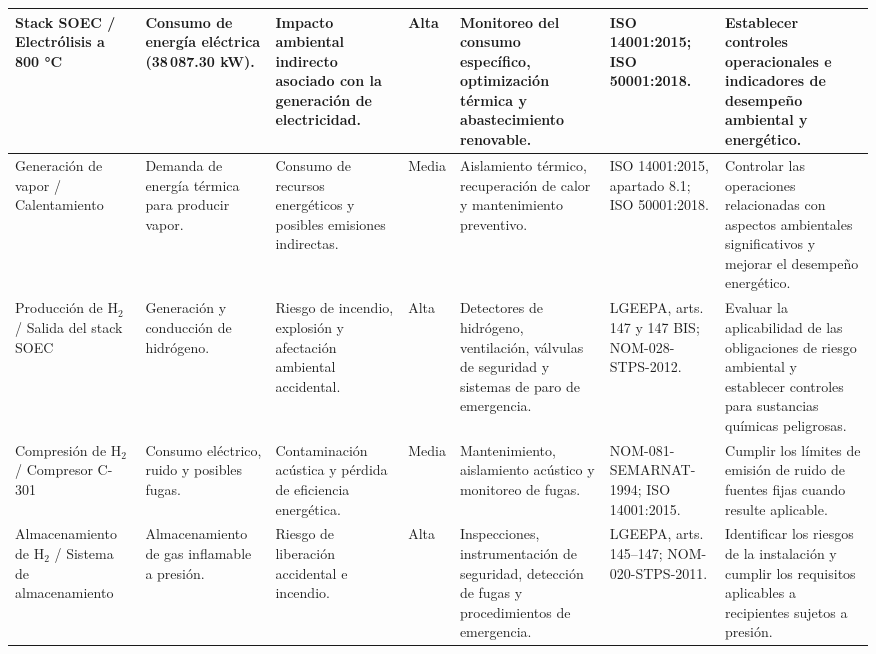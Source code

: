 \documentclass[11pt,letterpaper]{article}
\begin{document}
\begin{landscape}
\begin{center}
\begin{longtable}{
|p{2.7cm}
|p{2.7cm}
|p{3.0cm}
|p{1.5cm}
|p{3.8cm}
|p{3.1cm}
|p{4.2cm}|}

Stack SOEC /
Electrólisis a 800 °C
&
Consumo de energía eléctrica
(38\,087.30 kW).
&
Impacto ambiental indirecto
asociado con la generación
de electricidad.
&
\cellcolor{rojoclaro}Alta
&
Monitoreo del consumo específico,
optimización térmica y
abastecimiento renovable.
&
ISO 14001:2015;
ISO 50001:2018.
&
Establecer controles operacionales
e indicadores de desempeño
ambiental y energético.
\\
\hline

Generación de vapor /
Calentamiento
&
Demanda de energía térmica
para producir vapor.
&
Consumo de recursos energéticos
y posibles emisiones indirectas.
&
\cellcolor{amarilloclaro}Media
&
Aislamiento térmico,
recuperación de calor
y mantenimiento preventivo.
&
ISO 14001:2015,
apartado 8.1;
ISO 50001:2018.
&
Controlar las operaciones
relacionadas con aspectos
ambientales significativos
y mejorar el desempeño energético.
\\
\hline


Producción de H$_2$ /
Salida del stack SOEC
&
Generación y conducción
de hidrógeno.
&
Riesgo de incendio,
explosión y afectación
ambiental accidental.
&
\cellcolor{rojoclaro}Alta
&
Detectores de hidrógeno,
ventilación, válvulas de
seguridad y sistemas de
paro de emergencia.
&
LGEEPA, arts. 147 y 147 BIS;
NOM-028-STPS-2012.
&
Evaluar la aplicabilidad de
las obligaciones de riesgo
ambiental y establecer
controles para sustancias
químicas peligrosas.
\\
\hline

Compresión de H$_2$ /
Compresor C-301
&
Consumo eléctrico,
ruido y posibles fugas.
&
Contaminación acústica
y pérdida de eficiencia
energética.
&
\cellcolor{amarilloclaro}Media
&
Mantenimiento,
aislamiento acústico
y monitoreo de fugas.
&
NOM-081-SEMARNAT-1994;
ISO 14001:2015.
&
Cumplir los límites de
emisión de ruido de fuentes
fijas cuando resulte aplicable.
\\
\hline

Almacenamiento de H$_2$ /
Sistema de almacenamiento
&
Almacenamiento de gas
inflamable a presión.
&
Riesgo de liberación
accidental e incendio.
&
\cellcolor{rojoclaro}Alta
&
Inspecciones,
instrumentación de seguridad,
detección de fugas
y procedimientos de emergencia.
&
LGEEPA, arts. 145--147;
NOM-020-STPS-2011.
&
Identificar los riesgos de
la instalación y cumplir
los requisitos aplicables
a recipientes sujetos a presión.
\\
\hline


\end{longtable}
\end{center}
\end{landscape}
\end{document}
